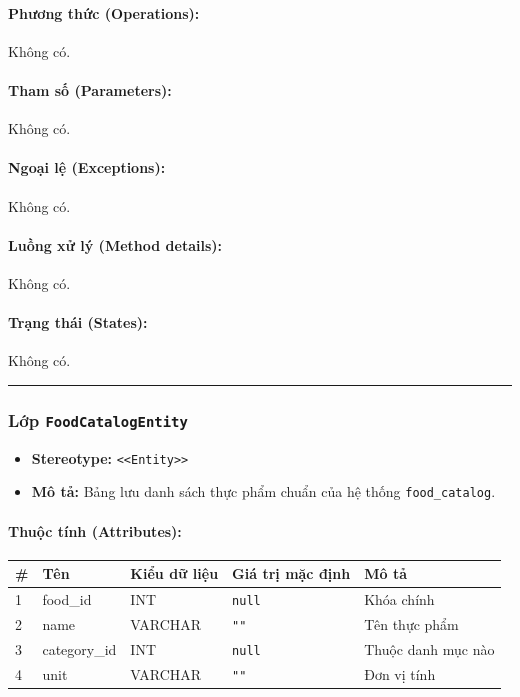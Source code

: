\documentclass[12pt,a4paper]{article}
\begin{document}
\paragraph{Phương thức (Operations):}
Không có.

\paragraph{Tham số (Parameters):}
Không có.

\paragraph{Ngoại lệ (Exceptions):}
Không có.

\paragraph{Luồng xử lý (Method details):}
Không có.

\paragraph{Trạng thái (States):}
Không có.

\vskip 0.5cm
\noindent\rule{\textwidth}{0.5pt}
\vskip 0.5cm

\subsubsection{Lớp \texttt{FoodCatalogEntity}}
\begin{itemize}[leftmargin=*]
    \item \textbf{Stereotype:} \texttt{\textless{}\textless{}Entity\textgreater{}\textgreater{}}
    \item \textbf{Mô tả:} Bảng lưu danh sách thực phẩm chuẩn của hệ thống \texttt{food\_catalog}.
\end{itemize}

\paragraph{Thuộc tính (Attributes):}
\begin{longtable}{|p{0.6cm}|p{2.8cm}|p{2.2cm}|p{1.8cm}|p{5.8cm}|}
\hline
\textbf{\#} & \textbf{Tên} & \textbf{Kiểu dữ liệu} & \textbf{Giá trị mặc định} & \textbf{Mô tả} \\ \hline
\endhead
1 & food\_id & INT & \texttt{null} & Khóa chính \\ \hline
2 & name & VARCHAR & \texttt{""} & Tên thực phẩm \\ \hline
3 & category\_id & INT & \texttt{null} & Thuộc danh mục nào \\ \hline
4 & unit & VARCHAR & \texttt{""} & Đơn vị tính \\ \hline
\end{longtable}
\end{document}
